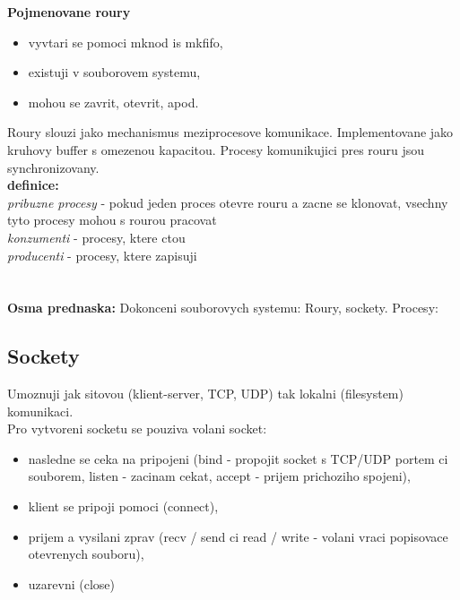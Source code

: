 \documentclass[a4paper, 11pt]{article}
\begin{document}
\textbf{Pojmenovane roury}
\begin{itemize}
    \item vyvtari se pomoci mknod is mkfifo,
    \item existuji v souborovem systemu,
    \item mohou se zavrit, otevrit, apod. \\
\end{itemize}

Roury slouzi jako mechanismus meziprocesove komunikace. Implementovane jako kruhovy buffer s omezenou kapacitou. Procesy komunikujici pres rouru jsou synchronizovany. \\

\textbf{definice:} \\[0.5em]
\textit{pribuzne procesy} - pokud jeden proces otevre rouru a zacne se klonovat, vsechny tyto procesy mohou s rourou pracovat \\[0.2em]
\textit{konzumenti} - procesy, ktere ctou \\[0.2em]
\textit{producenti} - procesy, ktere zapisuji \\

\newpage

\section{}
\textbf{Osma prednaska:} Dokonceni souborovych systemu: Roury, sockety. Procesy:

\subsection{Sockety}
Umoznuji jak sitovou (klient-server, TCP, UDP) tak lokalni (filesystem) komunikaci. \\

Pro vytvoreni socketu se pouziva volani socket:
\begin{itemize}
    \item nasledne se ceka na pripojeni (bind - propojit socket s TCP/UDP portem ci souborem, listen - zacinam cekat, accept - prijem prichoziho spojeni),
    \item klient se pripoji pomoci (connect),
    \item prijem a vysilani zprav (recv / send ci read / write - volani vraci popisovace otevrenych souboru),
    \item uzarevni (close) \\
\end{itemize}
\end{document}
